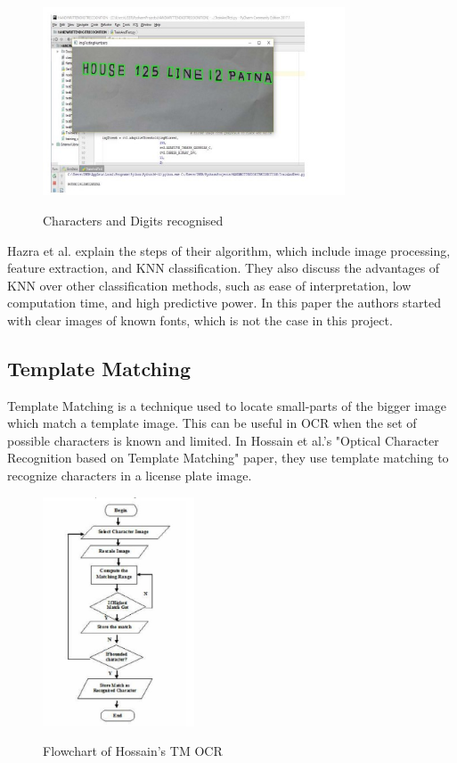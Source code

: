 \begin{figure}[!h]
    \centering
    \includegraphics[width=0.8\textwidth]{Figures/KNN_Hazra.jpg}
    \caption[Optical Character Recognition using KNN on Custom
        Image Dataset]{Characters and Digits recognised}\cite{joshuaDevelopmentImageProcessing2023}
    \label{fig:Hazra OCR KNN Paper}
\end{figure}

Hazra et al. explain the steps of their algorithm, which include image processing, feature extraction, and KNN classification. They also discuss the advantages of KNN over other classification methods, such as ease of interpretation, low computation time, and high predictive power. In this paper the authors started with clear images of known fonts, which is not the case in this project.


\newpage

\subsection{Template Matching}

Template Matching is a technique used to locate small-parts of the bigger image which match a template image. This can be useful in OCR when the set of possible characters is known and limited. In Hossain et al.'s "Optical Character Recognition based on Template Matching" paper, they use template matching to recognize characters in a license plate image.

\begin{figure}[ht]
    \centering
    \includegraphics[width=0.4\textwidth]{Figures/TM_Hossain.jpg}
    \caption[Flowchart of Template Matching OCR]{Flowchart of Hossain's TM OCR}\cite{hossainOpticalCharacterRecognition2019}
    \label{fig:Hossain OCR Template Matching Paper}
\end{figure}

